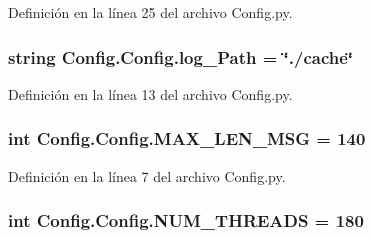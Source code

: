 Definición en la línea 25 del archivo Config.\-py.

\hypertarget{class_config_1_1_config_a101073e22bb0e11ae1e78063267eaf35}{
\subsubsection[{log\-\_\-\-Path}]{\setlength{\rightskip}{0pt plus 5cm}string Config.\-Config.\-log\-\_\-\-Path = \char`\"{}./cache\char`\"{}\hspace{0.3cm}{\ttfamily [static]}}}\label{class_config_1_1_config_a101073e22bb0e11ae1e78063267eaf35}


Definición en la línea 13 del archivo Config.\-py.

\hypertarget{class_config_1_1_config_a81b4f232892a63987c0712d291d68cd3}{
\subsubsection[{M\-A\-X\-\_\-\-L\-E\-N\-\_\-\-M\-S\-G}]{\setlength{\rightskip}{0pt plus 5cm}int Config.\-Config.\-M\-A\-X\-\_\-\-L\-E\-N\-\_\-\-M\-S\-G = 140\hspace{0.3cm}{\ttfamily [static]}}}\label{class_config_1_1_config_a81b4f232892a63987c0712d291d68cd3}


Definición en la línea 7 del archivo Config.\-py.

\hypertarget{class_config_1_1_config_a30a0b4f26a731f1f315b86b16eef807c}{
\subsubsection[{N\-U\-M\-\_\-\-T\-H\-R\-E\-A\-D\-S}]{\setlength{\rightskip}{0pt plus 5cm}int Config.\-Config.\-N\-U\-M\-\_\-\-T\-H\-R\-E\-A\-D\-S = 180\hspace{0.3cm}{\ttfamily [static]}}}\label{class_config_1_1_config_a30a0b4f26a731f1f315b86b16eef807c}


